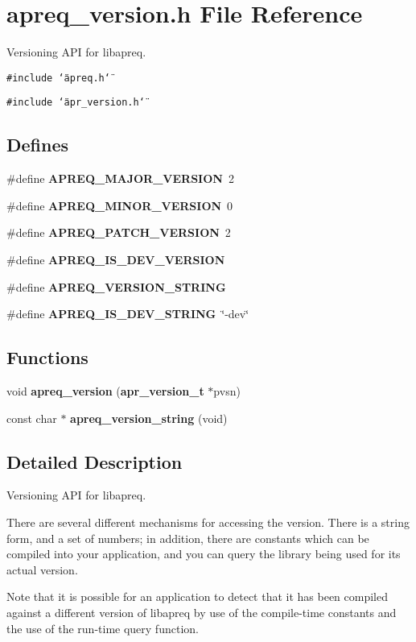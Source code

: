 \section{apreq\_\-version.h File Reference}
\label{apreq__version_8h}
Versioning API for libapreq. 


{\tt \#include \char`\"{}apreq.h\char`\"{}}\par
{\tt \#include \char`\"{}apr\_\-version.h\char`\"{}}\par
\subsection*{Defines}
\begin{CompactItemize}
\item 
\#define {\bf APREQ\_\-MAJOR\_\-VERSION}\ 2
\item 
\#define {\bf APREQ\_\-MINOR\_\-VERSION}\ 0
\item 
\#define {\bf APREQ\_\-PATCH\_\-VERSION}\ 2
\item 
\#define {\bf APREQ\_\-IS\_\-DEV\_\-VERSION}
\item 
\#define {\bf APREQ\_\-VERSION\_\-STRING}
\item 
\#define {\bf APREQ\_\-IS\_\-DEV\_\-STRING}\ \char`\"{}-dev\char`\"{}
\end{CompactItemize}
\subsection*{Functions}
\begin{CompactItemize}
\item 
void {\bf apreq\_\-version} ({\bf apr\_\-version\_\-t} $\ast$pvsn)
\item 
const char $\ast$ {\bf apreq\_\-version\_\-string} (void)
\end{CompactItemize}


\subsection{Detailed Description}
Versioning API for libapreq.

There are several different mechanisms for accessing the version. There is a string form, and a set of numbers; in addition, there are constants which can be compiled into your application, and you can query the library being used for its actual version.

Note that it is possible for an application to detect that it has been compiled against a different version of libapreq by use of the compile-time constants and the use of the run-time query function.

